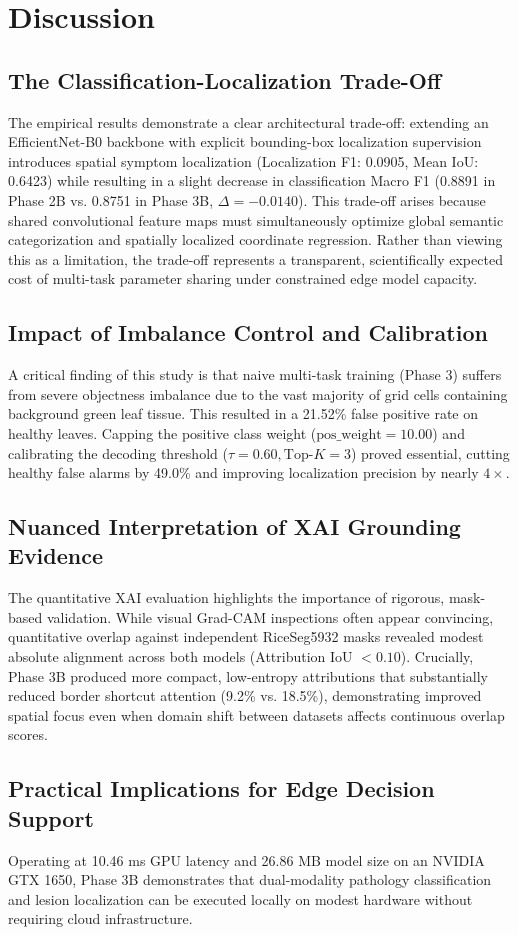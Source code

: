 \section{Discussion}
\label{sec:discussion}

\subsection{The Classification-Localization Trade-Off}
The empirical results demonstrate a clear architectural trade-off: extending an EfficientNet-B0 backbone with explicit bounding-box localization supervision introduces spatial symptom localization (Localization F1: 0.0905, Mean IoU: 0.6423) while resulting in a slight decrease in classification Macro F1 (0.8891 in Phase 2B vs. 0.8751 in Phase 3B, $\Delta = -0.0140$). This trade-off arises because shared convolutional feature maps must simultaneously optimize global semantic categorization and spatially localized coordinate regression. Rather than viewing this as a limitation, the trade-off represents a transparent, scientifically expected cost of multi-task parameter sharing under constrained edge model capacity.

\subsection{Impact of Imbalance Control and Calibration}
A critical finding of this study is that naive multi-task training (Phase 3) suffers from severe objectness imbalance due to the vast majority of grid cells containing background green leaf tissue. This resulted in a 21.52\% false positive rate on healthy leaves. Capping the positive class weight ($\text{pos\_weight}=10.00$) and calibrating the decoding threshold ($\tau=0.60, \text{Top-}K=3$) proved essential, cutting healthy false alarms by 49.0\% and improving localization precision by nearly $4\times$.

\subsection{Nuanced Interpretation of XAI Grounding Evidence}
The quantitative XAI evaluation highlights the importance of rigorous, mask-based validation. While visual Grad-CAM inspections often appear convincing, quantitative overlap against independent RiceSeg5932 masks revealed modest absolute alignment across both models (Attribution IoU $< 0.10$). Crucially, Phase 3B produced more compact, low-entropy attributions that substantially reduced border shortcut attention (9.2\% vs. 18.5\%), demonstrating improved spatial focus even when domain shift between datasets affects continuous overlap scores.

\subsection{Practical Implications for Edge Decision Support}
Operating at 10.46 ms GPU latency and 26.86 MB model size on an NVIDIA GTX 1650, Phase 3B demonstrates that dual-modality pathology classification and lesion localization can be executed locally on modest hardware without requiring cloud infrastructure.

